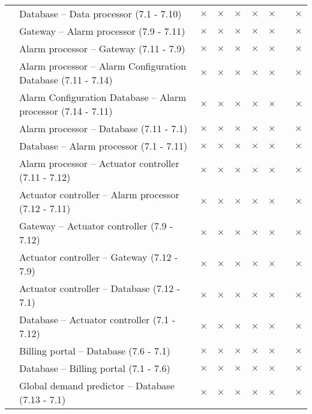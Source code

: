 \begin{table}[h!]
\begin{center}
\begin{longtable}{p{2.3cm} p{9cm} p{0.2cm} p{0.2cm} p{0.2cm} p{0.2cm}p{0.2cm} p{0.2cm} p{0.2cm} }
		   &  Database -- Data processor (7.1 - 7.10) & $\times$ & $\times$ & $\times$& $\times$ &  $\times$ & & $\times$\\
		   &  Gateway -- Alarm processor (7.9 - 7.11) & $\times$ & $\times$ & $\times$& $\times$ &  $\times$ & & $\times$\\
		   &  Alarm processor -- Gateway (7.11 - 7.9) & $\times$ & $\times$ & $\times$& $\times$ &  $\times$ & & $\times$\\
		   &  Alarm processor -- Alarm Configuration Database (7.11 - 7.14) & $\times$ & $\times$ & $\times$& $\times$ &  $\times$ & & $\times$\\
		   &  Alarm Configuration Database -- Alarm processor (7.14 - 7.11) & $\times$ & $\times$ & $\times$& $\times$ &  $\times$ & & $\times$\\
		   &  Alarm processor -- Database (7.11 - 7.1) & $\times$ & $\times$ & $\times$& $\times$ &  $\times$ & & $\times$\\
		   &  Database -- Alarm processor (7.1 - 7.11) & $\times$ & $\times$ & $\times$& $\times$ &  $\times$ & & $\times$\\
		   &  Alarm processor -- Actuator controller (7.11 - 7.12) & $\times$ & $\times$ & $\times$& $\times$ &  $\times$ & & $\times$\\
		   &  Actuator controller -- Alarm processor (7.12 - 7.11) & $\times$ & $\times$ & $\times$& $\times$ &  $\times$ & & $\times$\\
		   &  Gateway -- Actuator controller (7.9 - 7.12) & $\times$ & $\times$ & $\times$& $\times$ &  $\times$ & & $\times$\\
		   &  Actuator controller -- Gateway (7.12 - 7.9) & $\times$ & $\times$ & $\times$& $\times$ &  $\times$ & & $\times$\\
		   &  Actuator controller -- Database (7.12 - 7.1) & $\times$ & $\times$ & $\times$& $\times$ &  $\times$ & & $\times$\\
		   &  Database -- Actuator controller (7.1 - 7.12) & $\times$ & $\times$ & $\times$& $\times$ &  $\times$ & & $\times$\\
		   &  Billing portal -- Database (7.6 - 7.1) & $\times$ & $\times$ & $\times$& $\times$ &  $\times$ & & $\times$\\
		   &  Database -- Billing portal (7.1 - 7.6) & $\times$ & $\times$ & $\times$& $\times$ &  $\times$ & & $\times$\\
		   &  Global demand predictor -- Database (7.13 - 7.1) & $\times$ & $\times$ & $\times$& $\times$ &  $\times$ & & $\times$\\

\end{longtable}
\end{center}
\end{table}
